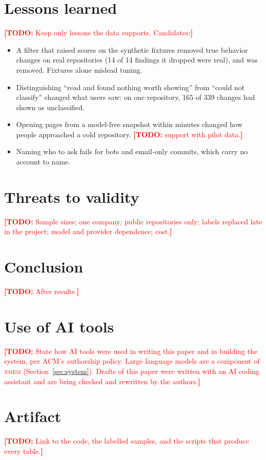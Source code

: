 \documentclass[acmsmall,screen,review]{acmart}
\newcommand{\todo}[1]{\textcolor{red}{\textbf{[TODO:} #1\textbf{]}}}
\newcommand{\nmem}{\textsc{nmem}}
\begin{document}
\section{Lessons learned}
\todo{Keep only lessons the data supports. Candidates:}
\begin{itemize}
  \item A filter that raised scores on the synthetic fixtures removed true behavior changes on real repositories
        (14 of 14 findings it dropped were real), and was removed. Fixtures alone mislead tuning.
  \item Distinguishing ``read and found nothing worth showing'' from ``could not classify'' changed what users saw:
        on one repository, 165 of 339 changes had shown as unclassified.
  \item Opening pages from a model-free snapshot within minutes changed how people approached a cold repository.
        \todo{support with pilot data.}
  \item Naming who to ask fails for bots and email-only commits, which carry no account to name.
\end{itemize}

\section{Threats to validity}
\todo{Sample sizes; one company; public repositories only; labels replaced late in the project; model and provider
dependence; cost.}

\section{Conclusion}
\todo{After results.}

\section*{Use of AI tools}
\todo{State how AI tools were used in writing this paper and in building the system, per ACM's authorship policy.
Large language models are a component of \nmem{} (Section~\ref{sec:system}). Drafts of this paper were written with
an AI coding assistant and are being checked and rewritten by the authors.}

\section*{Artifact}
\todo{Link to the code, the labelled samples, and the scripts that produce every table.}



\end{document}
